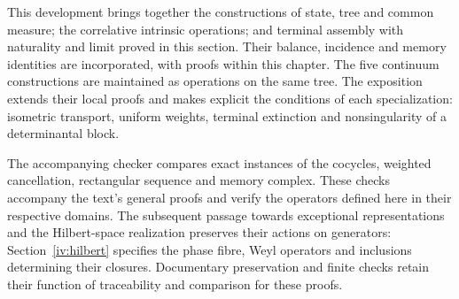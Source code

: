 This development brings together the constructions of state, tree and common measure; the correlative intrinsic operations; and terminal assembly with naturality and limit proved in this section. Their balance, incidence and memory identities are incorporated, with proofs within this chapter. The five continuum constructions are maintained as operations on the same tree. The exposition extends their local proofs and makes explicit the conditions of each specialization: isometric transport, uniform weights, terminal extinction and nonsingularity of a determinantal block.

The accompanying checker compares exact instances of the cocycles, weighted cancellation, rectangular sequence and memory complex. These checks accompany the text's general proofs and verify the operators defined here in their respective domains. The subsequent passage towards exceptional representations and the Hilbert-space realization preserves their actions on generators: Section~\ref{iv:hilbert} specifies the phase fibre, Weyl operators and inclusions determining their closures. Documentary preservation and finite checks retain their function of traceability and comparison for these proofs.
